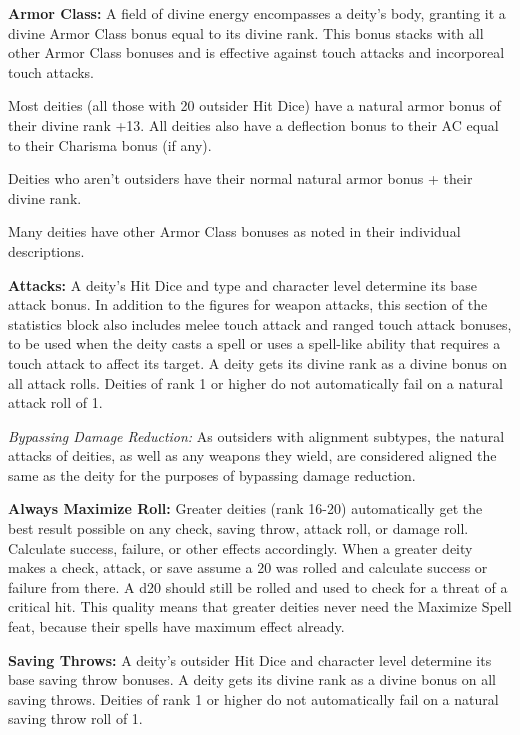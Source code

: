 \documentclass{article}
\begin{document}
\vspace{12pt}
\textbf{Armor Class:} A field of divine energy encompasses a deity's body, granting 
it a divine Armor Class bonus equal to its divine rank. This bonus stacks with 
all other Armor Class bonuses and is effective against touch attacks and incorporeal 
touch attacks.

Most deities (all those with 20 outsider Hit Dice) have a natural armor bonus of 
their divine rank +13. All deities also have a deflection bonus to their AC equal 
to their Charisma bonus (if any).

Deities who aren't outsiders have their normal natural armor bonus + their divine 
rank.

Many deities have other Armor Class bonuses as noted in their individual descriptions.

\vspace{12pt}
\textbf{Attacks:} A deity's Hit Dice and type and character level determine its 
base attack bonus. In addition to the figures for weapon attacks, this section 
of the statistics block also includes melee touch attack and ranged touch attack 
bonuses, to be used when the deity casts a spell or uses a spell-like ability that 
requires a touch attack to affect its target. A deity gets its divine rank as a 
divine bonus on all attack rolls. Deities of rank 1 or higher do not automatically 
fail on a natural attack roll of 1.

\textit{Bypassing Damage Reduction:} As outsiders with alignment subtypes, the 
natural attacks of deities, as well as any weapons they wield, are considered aligned 
the same as the deity for the purposes of bypassing damage reduction.

\vspace{12pt}
\textbf{Always Maximize Roll:} Greater deities (rank 16-20) automatically get the 
best result possible on any check, saving throw, attack roll, or damage roll. Calculate 
success, failure, or other effects accordingly. When a greater deity makes a check, 
attack, or save assume a 20 was rolled and calculate success or failure from there. 
A d20 should still be rolled and used to check for a threat of a critical hit. 
 This quality means that greater deities never need the Maximize Spell feat, because 
their spells have maximum effect already.

\vspace{12pt}
\textbf{Saving Throws:} A deity's outsider Hit Dice and character level determine 
its base saving throw bonuses. A deity gets its divine rank as a divine bonus on 
all saving throws. Deities of rank 1 or higher do not automatically fail on a natural 
saving throw roll of 1.
\end{document}

